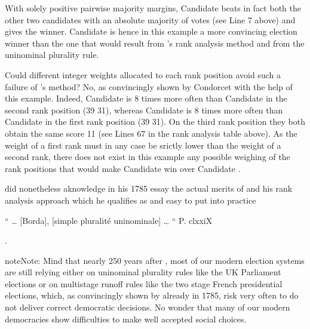 \documentclass[a4paper,12pt,english]{sphinxhowto}
\begin{document}
\sphinxAtStartPar
With solely positive pairwise majority margins, Candidate  beats in fact both the other two candidates with an absolute majority of votes (see Line 7 above) and gives the  winner. Candidate  is hence in this example a more convincing election winner than the one that would result from ’s rank analysis method and from the uninominal plurality rule.

\sphinxAtStartPar
Could different integer weights allocated to each rank position avoid such a failure of ’s method? No, as convincingly shown by Condorcet with the help of this example. Indeed, Candidate  is 8 times more often than Candidate  in the second rank position (39 \sphinxhyphen{} 31), whereas Candidate  is 8 times more often than Candidate  in the first rank position (39 \sphinxhyphen{} 31). On the third rank position they both obtain the same score 11 (see Lines 6\sphinxhyphen{}7 in the rank analysis table above). As the weight of a first rank must in any case be srictly lower than the weight of a second rank, there does not exist in this example any possible weighing of the rank positions that would make Candidate  win over Candidate .

\sphinxAtStartPar
{} did nonetheless aknowledge in his 1785 essay the actual merits of  and his rank analysis approach which he qualifies as  and easy to put into practice %
\begin{footnote}[19]\sphinxAtStartFootnote
“ …  {[}Borda{]},  {[}simple pluralité uninominale{]}  … “  P. clxxiX
%
\end{footnote}.

\begin{sphinxadmonition}{note}{Note:}
\sphinxAtStartPar
Mind that nearly 250 years after , most of our modern election systems are still relying either on uninominal plurality rules like the UK Parliament elections or on multi\sphinxhyphen{}stage runoff rules like the two stage French presidential elections, which, as convincingly shown by  already in 1785, risk very often to do not deliver correct democratic decisions. No wonder that many of our modern democracies show difficulties to make well accepted social choices.
\end{sphinxadmonition}
\end{document}

